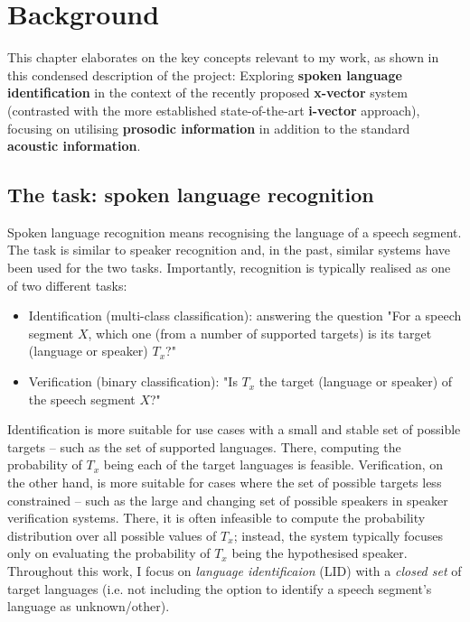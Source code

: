 \documentclass[bsc,frontabs,twoside,singlespacing,parskip,deptreport]{infthesis}
\begin{document}
\chapter{Background}{
  \label{chap:Background}
  This chapter elaborates on the key concepts relevant to my work, as shown in this condensed description of the project: Exploring \textbf{spoken language identification} in the context of the recently proposed \textbf{x-vector} system (contrasted with the more established state-of-the-art \textbf{i-vector} approach), focusing on utilising \textbf{prosodic information} in addition to the standard \textbf{acoustic information}.

  \section{The task: spoken language recognition}{
    \label{sec:LID}
    Spoken language recognition means recognising the language of a speech segment. The task is similar to speaker recognition and, in the past, similar systems have been used for the two tasks. Importantly, recognition is typically realised as one of two different tasks: 
    \begin{itemize}
      \item {Identification (multi-class classification): answering the question "For a speech segment $X$, which one (from a number of supported targets) is its target (language or speaker) $T_x$?"}
      \item {Verification (binary classification): "Is $T_x$ the target (language or speaker) of the speech segment $X$?"}
    \end{itemize}
    Identification is more suitable for use cases with a small and stable set of possible targets -- such as the set of supported languages. There, computing the probability of $T_x$ being each of the target languages is feasible. Verification, on the other hand, is more suitable for cases where the set of possible targets less constrained -- such as the large and changing set of possible speakers in speaker verification systems. There, it is often infeasible to compute the probability distribution over all possible values of $T_x$; instead, the system typically focuses only on evaluating the probability of $T_x$ being the hypothesised speaker. Throughout this work, I focus on \textit{language identificaion} (LID) with a \textit{closed set} of target languages (i.e. not including the option to identify a speech segment's language  as unknown/other).
  }

}
\end{document}
